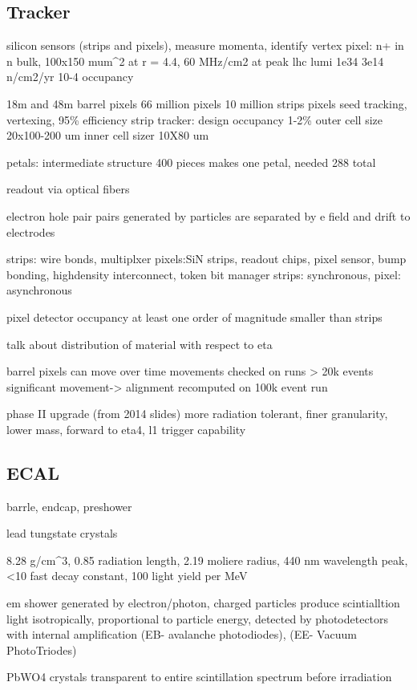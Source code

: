 \documentclass[oneside, letterpaper, oldfontcommands]{memoir}
\begin{document}
\subsection{Tracker}\label{tracker}
silicon sensors (strips and pixels), measure momenta, identify vertex
pixel: n+ in n bulk, 100x150 mum^2
at r = 4.4, 60 MHz/cm2 at peak lhc lumi 1e34
3e14 n/cm2/yr
10-4 occupancy

18m and 48m barrel pixels
66 million pixels
10 million strips
pixels seed tracking, vertexing, 95\% efficiency
strip tracker: design occupancy 1-2\%
outer cell size 20x100-200 um
inner cell sizer 10X80 um

petals: intermediate structure
400 pieces makes one petal, needed 288 total

readout via optical fibers

electron hole pair pairs generated by particles are separated by e field and drift to electrodes

strips: wire bonds, multiplxer
pixels:SiN strips, readout chips, pixel sensor, bump bonding, highdensity interconnect, token bit manager
strips: synchronous, pixel: asynchronous

pixel detector occupancy at least one order of magnitude smaller than strips

talk about distribution of material with respect to eta

barrel pixels can move over time
movements checked on runs > 20k events
significant movement-> alignment recomputed on 100k event run

phase II upgrade (from 2014 slides) more radiation tolerant, finer granularity, lower mass, forward to eta4, l1 trigger capability
\subsection{ECAL}\label{ecal}
barrle, endcap, preshower

lead tungstate crystals

8.28 g/cm^3, 0.85 radiation length, 2.19 moliere radius, 440 nm wavelength peak, <10 fast decay constant, 100 light yield per MeV

em shower generated by electron/photon, charged particles produce scintialltion light isotropically, 
proportional to particle energy, detected by photodetectors with internal amplification (EB- avalanche photodiodes), (EE- Vacuum PhotoTriodes)

PbWO4 crystals transparent to entire scintillation spectrum before irradiation
\end{document}
